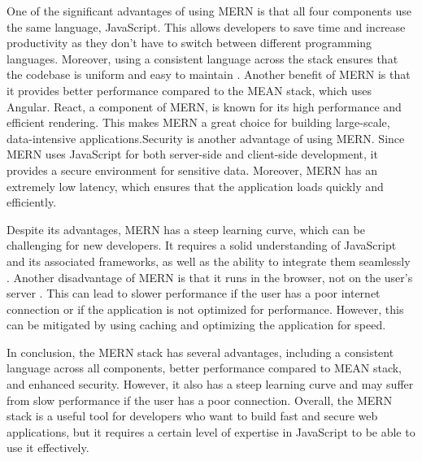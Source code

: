 One of the significant advantages of using MERN is that all four components use the same language, JavaScript. This allows developers to save time and increase productivity as they don't have to switch between different programming languages. Moreover, using a consistent language across the stack ensures that the codebase is uniform and easy to maintain \cite{shama}. Another benefit of MERN is that it provides better performance compared to the MEAN stack, which uses Angular. React, a component of MERN, is known for its high performance and efficient rendering. This makes MERN a great choice for building large-scale, data-intensive applications.Security is another advantage of using MERN. Since MERN uses JavaScript for both server-side and client-side development, it provides a secure environment for sensitive data. Moreover, MERN has an extremely low latency, which ensures that the application loads quickly and efficiently.

Despite its advantages, MERN has a steep learning curve, which can be challenging for new developers. It requires a solid understanding of JavaScript and its associated frameworks, as well as the ability to integrate them seamlessly \cite{eddy}. Another disadvantage of MERN is that it runs in the browser, not on the user's server \cite{asvj}. This can lead to slower performance if the user has a poor internet connection or if the application is not optimized for performance. However, this can be mitigated by using caching and optimizing the application for speed.

In conclusion, the MERN stack has several advantages, including a consistent language across all components, better performance compared to MEAN stack, and enhanced security. However, it also has a steep learning curve and may suffer from slow performance if the user has a poor connection. Overall, the MERN stack is a useful tool for developers who want to build fast and secure web applications, but it requires a certain level of expertise in JavaScript to be able to use it effectively.